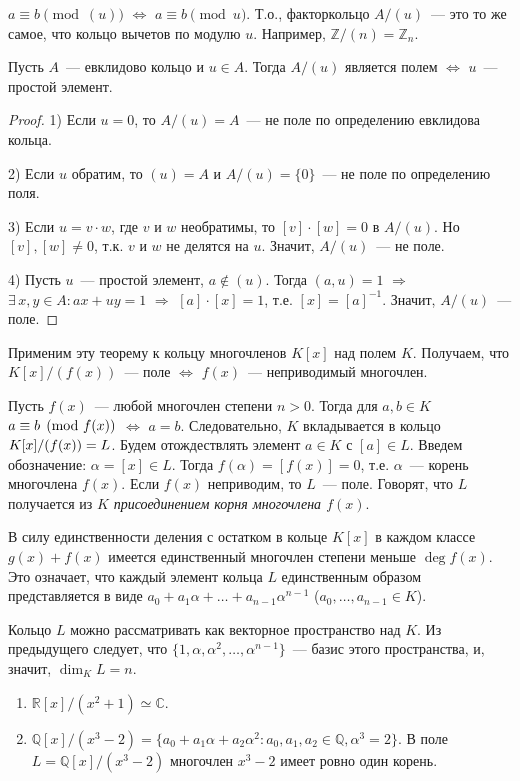 \documentclass[a4paper]{article}
\newcommand*{\p}[1]{#1\nobreak\discretionary{}{\hbox{$\mathsurround=0pt #1$}}{}}
\begin{document}
$a\equiv b\pmod{(u)}$ $\Leftrightarrow$ $a\equiv b\pmod{u}$. Т.о.,
факторкольцо $A/(u)$~--- это то же самое, что кольцо вычетов по
модулю $u$. Например, $\mathbb{Z}/(n)=\mathbb{Z}_n$.

\begin{theorem}
Пусть $A$~--- евклидово кольцо и $u\in A$. Тогда $A/(u)$ является
полем $\Leftrightarrow$ $u$~--- простой элемент.
\end{theorem}

\begin{proof}
1) Если $u=0$, то $A/(u)=A$~--- не поле по определению евклидова
кольца.

2) Если $u$ обратим, то $(u)=A$ и $A/(u)=\{0\}$~--- не поле по
определению поля.

3) Если $u=v\cdot w$, где $v$ и $w$ необратимы, то $[v]\cdot[w]=0$ в
$A/(u)$. Но $[v],[w]\neq0$, т.к. $v$ и $w$ не делятся на $u$.
Значит, $A/(u)$~--- не поле.

4) Пусть $u$~--- простой элемент, $a\notin(u)$. Тогда $(a,u)=1$
$\Rightarrow$ $\exists \, x,y\in A: ax+uy=1$ $\Rightarrow$
$[a]\cdot[x]=1$, т.е. $[x]=[a]^{-1}$. Значит, $A/(u)$~--- поле.
\end{proof}

Применим эту теорему к кольцу многочленов $K[x]$ над полем $K$.
Получаем, что $K[x]/(f(x))$~--- поле $\Leftrightarrow$ $f(x)$~---
неприводимый многочлен.

Пусть $f(x)$~--- любой многочлен степени $n>0$. Тогда для $a,b\in K$
$a\p\equiv b\pmod{f(x)}$ $\Leftrightarrow$ $a=b$. Следовательно, $K$
вкладывается в кольцо $K[x]/(f(x))\p=L$. Будем отождествлять элемент
$a\in K$ с $[a]\in L$. Введем обозначение: $\alpha=[x]\in L$. Тогда
$f(\alpha)=[f(x)]=0$, т.е. $\alpha$~--- корень многочлена $f(x)$.
Если $f(x)$ неприводим, то $L$~--- поле. Говорят, что $L$ получается
из $K$ \emph{присоединением корня многочлена $f(x)$}.

В силу единственности деления с остатком в кольце $K[x]$ в каждом
классе $g(x)+{f(x)}$ имеется единственный многочлен степени меньше
$\deg f(x)$. Это означает, что каждый элемент кольца $L$
единственным образом представляется в виде
$a_0+a_1\alpha+\ldots+a_{n-1}\alpha^{n-1}$ ($a_0,\ldots,a_{n-1}\in
K$).

Кольцо $L$ можно рассматривать как векторное пространство над $K$.
Из предыдущего следует, что
$\{1,\alpha,\alpha^2,\ldots,\alpha^{n-1}\}$~--- базис этого
пространства, и, значит, $\dim_K L=n$.

\prim
\begin{enumerate}
  \item $\mathbb{R}[x]/(x^2+1)\simeq \mathbb{C}$.
  \item $\mathbb{Q}[x]/(x^3-2)=\{a_0+a_1\alpha+a_2\alpha^2: a_0,a_1,a_2\in\mathbb{Q},
  \alpha^3=2\}$. В поле $L=\mathbb{Q}[x]/(x^3-2)$ многочлен $x^3-2$
  имеет ровно один корень.
\end{enumerate}
\end{document}
